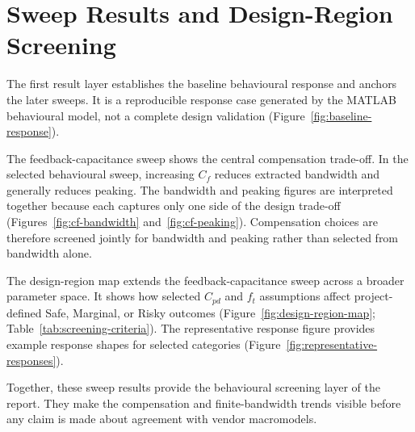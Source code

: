 \section{Sweep Results and Design-Region Screening}

The first result layer establishes the baseline behavioural response and anchors the later sweeps. It is a reproducible response case generated by the MATLAB behavioural model, not a complete design validation (Figure~\ref{fig:baseline-response}).

The feedback-capacitance sweep shows the central compensation trade-off. In the selected behavioural sweep, increasing $C_f$ reduces extracted bandwidth and generally reduces peaking. The bandwidth and peaking figures are interpreted together because each captures only one side of the design trade-off (Figures~\ref{fig:cf-bandwidth} and~\ref{fig:cf-peaking}). Compensation choices are therefore screened jointly for bandwidth and peaking rather than selected from bandwidth alone.

The design-region map extends the feedback-capacitance sweep across a broader parameter space. It shows how selected $C_{pd}$ and $f_t$ assumptions affect project-defined Safe, Marginal, or Risky outcomes (Figure~\ref{fig:design-region-map}; Table~\ref{tab:screening-criteria}). The representative response figure provides example response shapes for selected categories (Figure~\ref{fig:representative-responses}).

Together, these sweep results provide the behavioural screening layer of the report. They make the compensation and finite-bandwidth trends visible before any claim is made about agreement with vendor macromodels.
